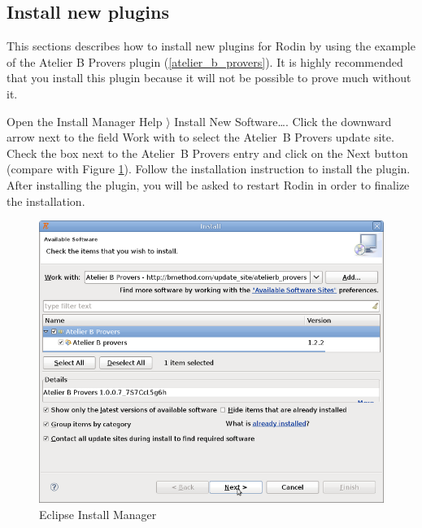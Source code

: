 \subsection{Install new plugins}
\label{tut_install_plugins}

This sections describes how to install new plugins for Rodin by using the example of the Atelier B Provers plugin (\ref{atelier_b_provers}). It is highly recommended that you install this plugin because it will not be possible to prove much without it.

Open the Install Manager \textsf{Help $\rangle$ Install New Software\ldots}. Click the downward arrow next to the field \textsf{Work with} to select the Atelier~B Provers update site. Check the box next to the Atelier~B Provers entry and click on the \textsf{Next} button (compare with Figure \ref{fig_tut_02_install_manager}). Follow the installation instruction to install the plugin. After installing the plugin, you will be asked to restart Rodin in order to finalize the installation.


\begin{figure}[!ht]
\begin{center}
	\includegraphics{img/tutorial/tut_02_install3.png}
	\caption{Eclipse Install Manager}
	\label{fig_tut_02_install_manager}
\end{center}
\end{figure}


